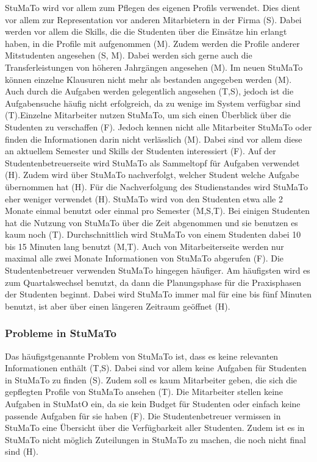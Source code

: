 \documentclass[
  12pt,
  ngerman,
  a4paper,
]{article}
\begin{document}
StuMaTo wird vor allem zum Pflegen des eigenen Profils verwendet. Dies
dient vor allem zur Representation vor anderen Mitarbietern in der Firma
(S). Dabei werden vor allem die Skills, die die Studenten über die
Einsätze hin erlangt haben, in die Profile mit aufgenommen (M). Zudem
werden die Profile anderer Mitstudenten angesehen (S, M). Dabei werden
sich gerne auch die Transferleistungen von höheren Jahrgängen angesehen
(M). Im neuen StuMaTo können einzelne Klausuren nicht mehr als bestanden
angegeben werden (M). Auch durch die Aufgaben werden gelegentlich
angesehen (T,S), jedoch ist die Aufgabensuche häufig nicht erfolgreich,
da zu wenige im System verfügbar sind (T).Einzelne Mitarbeiter nutzen
StuMaTo, um sich einen Überblick über die Studenten zu verschaffen (F).
Jedoch kennen nicht alle Mitarbeiter StuMaTo oder finden die
Informationen darin nicht verlässlich (M). Dabei sind vor allem diese an
aktuellem Semester und Skills der Studenten interessiert (F). Auf der
Studentenbetreuerseite wird StuMaTo als Sammeltopf für Aufgaben
verwendet (H). Zudem wird über StuMaTo nachverfolgt, welcher Student
welche Aufgabe übernommen hat (H). Für die Nachverfolgung des
Studienstandes wird StuMaTo eher weniger verwendet (H). StuMaTo wird von
den Studenten etwa alle 2 Monate einmal benutzt oder einmal pro Semester
(M,S,T). Bei einigen Studenten hat die Nutzung von StuMaTo über die Zeit
abgenommen und sie benutzen es kaum noch (T). Durchschnittlich wird
StuMaTo von einem Studenten dabei 10 bis 15 Minuten lang benutzt (M,T).
Auch von Mitarbeiterseite werden nur maximal alle zwei Monate
Informationen von StuMaTo abgerufen (F). Die Studentenbetreuer verwenden
StuMaTo hingegen häufiger. Am häufigsten wird es zum Quartalswechsel
benutzt, da dann die Planungsphase für die Praxisphasen der Studenten
beginnt. Dabei wird StuMaTo immer mal für eine bis fünf Minuten benutzt,
ist aber über einen längeren Zeitraum geöffnet (H).

\hypertarget{probleme-in-stumato}{%
\subsubsection{Probleme in StuMaTo}\label{probleme-in-stumato}}

Das häufigstgenannte Problem von StuMaTo ist, dass es keine relevanten
Informationen enthält (T,S). Dabei sind vor allem keine Aufgaben für
Studenten in StuMaTo zu finden (S). Zudem soll es kaum Mitarbeiter
geben, die sich die gepflegten Profile von StuMaTo ansehen (T). Die
Mitarbeiter stellen keine Aufgaben in StuMatO ein, da sie kein Budget
für Studenten oder einfach keine passende Aufgaben für sie haben (F).
Die Studentenbetreuer vermissen in StuMaTo eine Übersicht über die
Verfügbarkeit aller Studenten. Zudem ist es in StuMaTo nicht möglich
Zuteilungen in StuMaTo zu machen, die noch nicht final sind (H).
\end{document}
